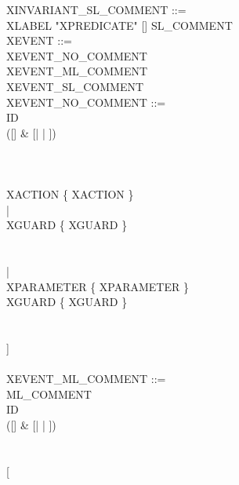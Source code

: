 \begin{center}
\begin{Bcode}
    XINVARIANT\_SL\_COMMENT ::= \\
    \Btab \Btab XLABEL "XPREDICATE" [\Btheorem] SL\_COMMENT\\
    XEVENT ::= \\
    \Btab \Btab XEVENT\_NO\_COMMENT\\
    \Btab \Btab XEVENT\_ML\_COMMENT\\
    \Btab \Btab XEVENT\_SL\_COMMENT\\
    XEVENT\_NO\_COMMENT ::=\\
    \Btab \Btab ID \\
    \Btab \Btab ([\Bextended] \& [\Bordinary | \Bconvergent | \Banticipated])\\
    \Btab {}\\
    \Btab \Btab [\Brefines{} ID \{ ID \}]\\
    \Btab \Btab [\\
    \Btab \Btab \Btab [\Bwith{} XWITNESS \{ XWITNESS \}] \\
    \Btab \Btab \Btab \Bbegin{} XACTION \{ XACTION \} \\
    \Btab \Btab \Btab | \\
    \Btab \Btab \Btab \Bwhen{} XGUARD \{ XGUARD \}\\
    \Btab \Btab {} \\
    \Btab \Btab {} \\
    \Btab \Btab \Btab | \\
    \Btab \Btab \Btab \Bany{} XPARAMETER \{ XPARAMETER \}\\
    \Btab \Btab \Btab \Bwhere{} XGUARD \{ XGUARD \}\\
    \Btab \Btab {} \\
    \Btab \Btab {} \\
    \Btab \Btab ]\\
    \Btab \Btab \Bend\\
    XEVENT\_ML\_COMMENT ::=\\
    \Btab \Btab ML\_COMMENT\\
    \Btab \Btab ID \\
    \Btab \Btab ([\Bextended] \& [\Bordinary | \Bconvergent | \Banticipated])\\
    \Btab {}\\
    \Btab \Btab [\Brefines{} ID \{ ID \}]\\
    \Btab \Btab [\\

\end{Bcode}
\end{center}
